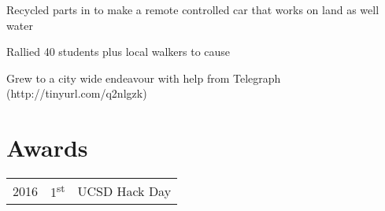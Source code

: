 \documentclass[]{deedy-resume-openfont}
\begin{document}
\begin{minipage}[t]{0.66\textwidth}
\begin{tightemize}
\item Recycled parts in to make a remote controlled car that works on land as well water
\end{tightemize}
\sectionsep

\begin{tightemize}
\item Rallied 40 students plus local walkers to cause
\item Grew to a city wide endeavour with help from Telegraph (http://tinyurl.com/q2nlgzk)
\end{tightemize}
\sectionsep


\section{Awards} 
\begin{tabular}{rll}
2016	     & 1\textsuperscript{st}  & UCSD Hack Day\\
\end{tabular}
\sectionsep

\end{minipage} 
\end{document}
